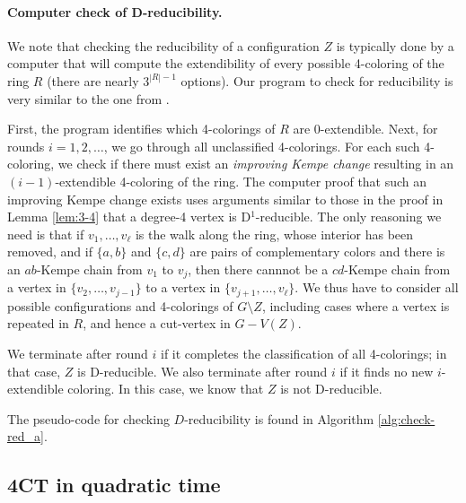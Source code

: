 \documentclass[10pt,a4paper]{article}
\newcommand{\carsten}[1]{\textbf{\textcolor{orange}{{C: } #1}}}
\begin{document}
\paragraph{Computer check of D-reducibility.}
We note that checking the reducibility of a configuration $Z$ is typically done by a computer that will compute the extendibility of every possible 4-coloring of the ring $R$
(there are nearly $3^{|R|-1}$ options). Our program to check for reducibility is very similar to the one from \cite{RSST}.

First, the program identifies which 4-colorings of $R$ are 0-extendible. Next, for rounds $i=1,2,\ldots$, we go through all unclassified 4-colorings. For each such 4-coloring, we check if there must
exist an \emph{improving Kempe change} resulting in an $(i-1)$-extendible 4-coloring of the ring. The computer proof that such an improving Kempe change exists uses arguments similar to those in the proof in Lemma \ref{lem:3-4} that a degree-4 vertex is D$^1$-reducible. The only reasoning we need is that if $v_1,\ldots, v_\ell$ is the walk along the ring, whose interior
has been removed, and if $\{a,b\}$ and $\{c,d\}$ are pairs of complementary colors and there is an $ab$-Kempe chain from $v_1$ to $v_j$, then there cannnot be a $cd$-Kempe chain from a vertex in $\{v_2,\ldots,v_{j-1}\}$ to a vertex in $\{v_{j+1},\ldots,v_\ell\}$.
We thus have to consider all possible configurations and 4-colorings of $G\setminus Z$, including cases where a vertex is repeated in $R$, and hence a cut-vertex in $G-V(Z)$.

We terminate after round $i$ if it completes the classification of all 4-colorings; in that case, $Z$ is D-reducible. We also terminate after round $i$ if it finds no new $i$-extendible coloring. In this case, we know that $Z$ is not D-reducible. 

The pseudo-code for checking $D$-reducibility is found in Algorithm \ref{alg:check-red_a}.




\subsection{4CT in quadratic time}
\end{document}
